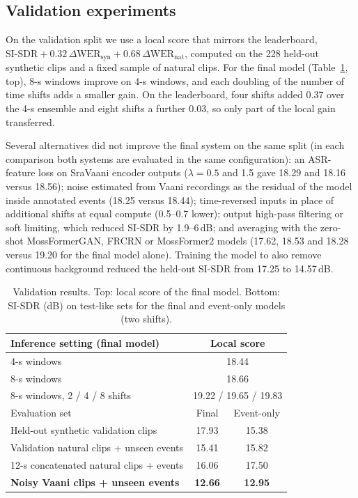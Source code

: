 \documentclass[conference]{IEEEtran}
\begin{document}
\subsection{Validation experiments}
On the validation split we use a local score that mirrors the leaderboard, $\text{SI-SDR}+0.32\,\Delta\text{WER}_\text{syn}+0.68\,\Delta\text{WER}_\text{nat}$, computed on the 228 held-out synthetic clips and a fixed sample of natural clips. For the final model (Table~\ref{tab:local}, top), 8-s windows improve on 4-s windows, and each doubling of the number of time shifts adds a smaller gain. On the leaderboard, four shifts added 0.37 over the 4-s ensemble and eight shifts a further 0.03, so only part of the local gain transferred.

Several alternatives did not improve the final system on the same split (in each comparison both systems are evaluated in the same configuration): an ASR-feature loss on SraVaani encoder outputs ($\lambda{=}0.5$ and 1.5 gave 18.29 and 18.16 versus 18.56); noise estimated from Vaani recordings as the residual of the model inside annotated events (18.25 versus 18.44); time-reversed inputs in place of additional shifts at equal compute (0.5--0.7 lower); output high-pass filtering or soft limiting, which reduced SI-SDR by 1.9--6\,dB; and averaging with the zero-shot MossFormerGAN, FRCRN or MossFormer2 models (17.62, 18.53 and 18.28 versus 19.20 for the final model alone). Training the model to also remove continuous background reduced the held-out SI-SDR from 17.25 to 14.57\,dB.

\begin{table}[t]\centering\caption{Validation results. Top: local score of the final model. Bottom: SI-SDR (dB) on test-like sets for the final and event-only models (two shifts).}\label{tab:local}\footnotesize\setlength{\tabcolsep}{3pt}
\begin{tabular}{lcc}\toprule
Inference setting (final model) & \multicolumn{2}{c}{Local score}\\\midrule
4-s windows & \multicolumn{2}{c}{18.44}\\
8-s windows & \multicolumn{2}{c}{18.66}\\
8-s windows, 2 / 4 / 8 shifts & \multicolumn{2}{c}{19.22 / 19.65 / 19.83}\\\midrule
Evaluation set & Final & Event-only\\\midrule
Held-out synthetic validation clips & 17.93 & 15.38\\
Validation natural clips + unseen events & 15.41 & 15.82\\
12-s concatenated natural clips + events & 16.06 & 17.50\\
\textbf{Noisy Vaani clips + unseen events} & \textbf{12.66} & \textbf{12.95}\\\bottomrule
\end{tabular}\end{table}
\end{document}
